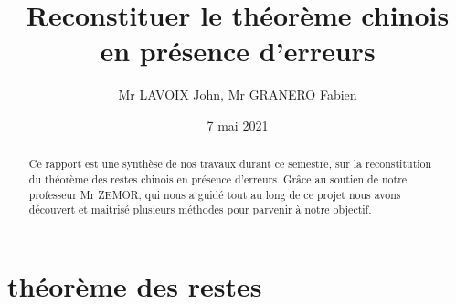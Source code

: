 \documentclass[a4paper, 11pt]{report}
\title{Reconstituer le théorème chinois en présence d’erreurs}
\author{Mr LAVOIX John, Mr GRANERO Fabien }
\date{7 mai 2021}
\begin{document}
\maketitle

\begin{abstract}

Ce rapport est  une synthèse de nos travaux durant ce semestre, sur la reconstitution du théorème des restes chinois en présence d'erreurs.
Grâce au soutien de notre professeur Mr ZEMOR, 
qui nous a guidé tout au long de ce projet nous avons découvert et maitrisé plusieurs méthodes pour parvenir à notre objectif.


\end{abstract}


\tableofcontents

\newpage

\chapter{théorème des restes}
\end{document}
